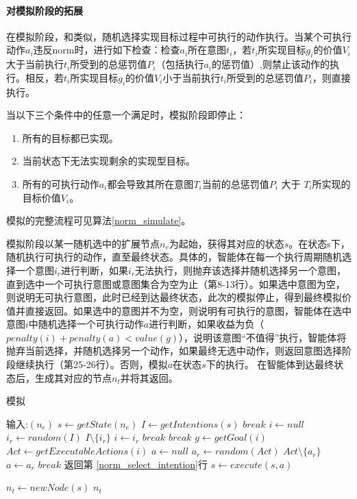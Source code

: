 \paragraph{对模拟阶段的拓展}
在模拟阶段，\SAN 和\SA 类似，随机选择实现目标过程中可执行的动作执行。当某个可执行动作$a_i$违反norm时，进行如下检查：检查$a_i$所在意图$t_i$，若$t_i$所实现目标$g_i$的价值$V_i$大于当前执行$t_i$所受到的总惩罚值$P_i$（包括执行$a_i$的惩罚值）,则禁止该动作的执行。相反，若$t_i$所实现目标$g_i$的价值$V_i$小于当前执行$t_i$所受到的总惩罚值$P_i$，则直接执行。

当以下三个条件中的任意一个满足时，模拟阶段即停止：
\begin{enumerate}
  \item 所有的目标都已实现。
  \item 当前状态下无法实现剩余的实现型目标。
  \item 所有的可执行动作$a_i$都会导致其所在意图$T_i$当前的总惩罚值$P_i$ 大于 $T_i$所实现的目标价值$V_i$。
\end{enumerate}
模拟的完整流程可见算法\ref{norm_simulate}。

模拟阶段以某一随机选中的扩展节点$n_e$为起始，获得其对应的状态$s$。在状态s下，随机执行可执行的动作，直至最终状态。具体的，智能体在每一个执行周期随机选择一个意图$i_r$进行判断，如果$i_r$无法执行，则抛弃该选择并随机选择另一个意图，直到选中一个可执行意图或意图集合为空为止（第8-13行）。如果选中意图为空，则说明无可执行意图，此时已经到达最终状态，此次的模拟停止，得到最终模拟价值并直接返回。如果选中的意图并不为空，则说明有可执行的意图，智能体在选中意图$i$中随机选择一个可执行动作$a$进行判断，如果收益为负（$penalty(i)+penalty(a) < value(g)$），说明该意图“不值得”执行，智能体将抛弃当前选择，并随机选择另一个动作，如果最终无选中动作，则返回意图选择阶段继续执行（第25-26行）。否则，模拟$a$在状态$s$下的执行。 在智能体到达最终状态后，生成其对应的节点$n_t$并将其返回。

\begin{algorithm}[H]
\caption{模拟}\label{norm_simulate}
\begin{algorithmic}[1]
\STATE 输入:$(n_e)$
\STATE $s \gets getState(n_e)$
  \STATE $I \gets getIntentions(s)$
    \STATE $break$
  \ENDIF
  \STATE $i \gets null$\label{norm_select_intention}
    \STATE $i_r \gets random(I)$
    \STATE $I \setminus \{i_r\}$
      \STATE $i \gets i_r$
      \STATE $break$
    \ENDIF
  \ENDWHILE
    \STATE $break$
  \ENDIF
  \STATE $g \gets getGoal(i)$
  \STATE $Act \gets getExecutableActions(i)$
  \STATE $a \gets null$
    \STATE $a_r \gets random(Act)$
    \STATE $Act \setminus \{a_r\}$
      \STATE $a \gets a_r$
      \STATE $break$
    \ENDIF
  \ENDWHILE
    \STATE 返回第 \ref{norm_select_intention}行
  \ENDIF
  \STATE $s \gets execute(s, a)$
\ENDWHILE

\STATE $n_t \gets newNode(s)$
\RETURN $n_t$
\end{algorithmic}
\end{algorithm}

